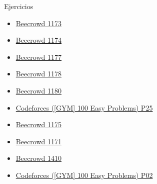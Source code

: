 \documentclass[12pt]{beamer}
\begin{document}
\begin{frame}{Ejercicios}
    \begin{itemize}
        \item \href{https://judge.beecrowd.com/es/problems/view/1173}{Beecrowd 1173}
        \item \href{https://judge.beecrowd.com/es/problems/view/1174}{Beecrowd 1174}
        \item \href{https://judge.beecrowd.com/es/problems/view/1177}{Beecrowd 1177}
        \item \href{https://judge.beecrowd.com/es/problems/view/1178}{Beecrowd 1178}
        \item \href{https://judge.beecrowd.com/es/problems/view/1180}{Beecrowd 1180}
        \item \href{https://codeforces.com/group/yg7WhsFsAp/contest/355494/problem/P25}{Codeforces ([GYM] 100 Easy Problems) P25}
        \item \href{https://judge.beecrowd.com/es/problems/view/1175}{Beecrowd 1175}
        \item \href{https://judge.beecrowd.com/es/problems/view/1171}{Beecrowd 1171}
        \item \href{https://judge.beecrowd.com/es/problems/view/1410}{Beecrowd 1410}
        \item \href{https://codeforces.com/group/yg7WhsFsAp/contest355490/problem/P02}{Codeforces ([GYM] 100 Easy Problems) P02}
    \end{itemize}
\end{frame}
\end{document}

